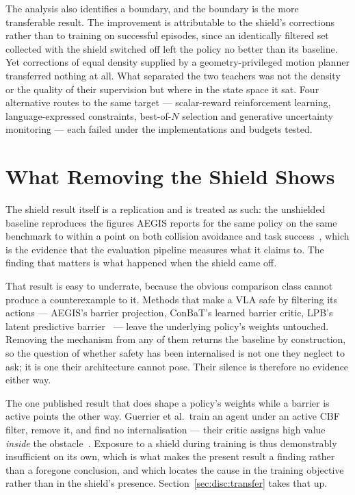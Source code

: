 \documentclass[a4paper,11pt]{report}
\begin{document}
The analysis also identifies a boundary, and the boundary is the more transferable result. The
improvement is attributable to the shield's corrections rather than to training on successful
episodes, since an identically filtered set collected with the shield switched off left the policy
no better than its baseline. Yet corrections of equal density supplied by a geometry-privileged
motion planner transferred nothing at all. What separated the two teachers was not the density or
the quality of their supervision but where in the state space it sat. Four alternative routes to
the same target --- scalar-reward reinforcement learning, language-expressed constraints,
best-of-$N$ selection and generative uncertainty monitoring --- each failed under the
implementations and budgets tested.

\section{What Removing the Shield Shows}\label{sec:disc:removal}

The shield result itself is a replication and is treated as such: the unshielded baseline reproduces
the figures AEGIS reports for the same policy on the same benchmark to within a point on both
collision avoidance and task success~\cite{vlsa2026}, which is the evidence that the evaluation
pipeline measures what it claims to. The finding that matters is what happened when the shield came
off.

That result is easy to underrate, because the obvious comparison class cannot produce a
counterexample to it. Methods that make a VLA safe by filtering its actions --- AEGIS's barrier
projection, ConBaT's learned barrier critic, LPB's latent predictive
barrier~\cite{vlsa2026,meng2024conbat,sun2025lpb} --- leave the underlying policy's weights
untouched. Removing the mechanism from any of them returns the baseline by construction, so the
question of whether safety has been internalised is not one they neglect to ask; it is one their
architecture cannot pose. Their silence is therefore no evidence either way.

The one published result that does shape a policy's weights while a barrier is active points the
other way. Guerrier et al.\ train an agent under an active CBF filter, remove it, and find no
internalisation --- their critic assigns high value \emph{inside} the
obstacle~\cite{guerrier2025guardrails}. Exposure to a shield during training is thus demonstrably
insufficient on its own, which is what makes the present result a finding rather than a foregone
conclusion, and which locates the cause in the training objective rather than in the shield's
presence. Section~\ref{sec:disc:transfer} takes that up.
\end{document}
